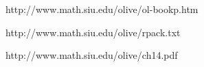 http://www.math.siu.edu/olive/ol-bookp.htm

http://www.math.siu.edu/olive/rpack.txt

http://www.math.siu.edu/olive/ch14.pdf
